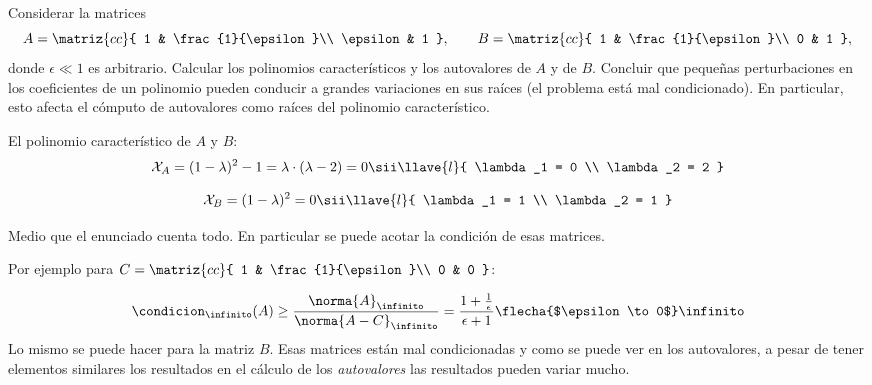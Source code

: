 \begin{enunciado}{\ejercicio}
  Considerar la matrices
  $$
    A =
    \matriz{cc}{
      1 & \frac{1}{\epsilon}\\
      \epsilon & 1
    },
    \qquad
    B =
    \matriz{cc}{
      1 & \frac{1}{\epsilon}\\
      0 & 1
    },
  $$
  donde $\epsilon \ll 1$ es arbitrario. Calcular los polinomios característicos y los autovalores de $A$ y de $B$.
  Concluir que pequeñas perturbaciones en los coeficientes de un polinomio pueden conducir
  a grandes variaciones en sus raíces (el problema está mal condicionado). En particular, esto
  afecta el cómputo de autovalores como raíces del polinomio característico.
\end{enunciado}

El polinomio característico de $A$ y $B$:
$$
  \mathcal{X}_A  =  (1 - \lambda)^2 - 1 = \lambda \cdot (\lambda - 2) = 0
  \sii
  \llave{l}{
    \lambda_1 = 0                                                             \\
    \lambda_2 = 2
  }                                                                         \\
$$

$$
  \mathcal{X}_B  =  (1 - \lambda)^2 = 0
  \sii
  \llave{l}{
    \lambda_1 = 1                                                             \\
    \lambda_2 = 1
  }
$$

Medio que el enunciado cuenta todo. En particular se puede acotar la condición de esas matrices.

Por ejemplo para
$C =
  \matriz{cc}{
    1 & \frac{1}{\epsilon}\\
    0 & 0
  }$:

$$
  \condicion_\infinito(A) \geq \frac{\norma{A}_\infinito}{\norma{A - C}_\infinito} =
  \frac{1 + \frac{1}{\epsilon}}{\epsilon + 1}
  \flecha{$\epsilon \to 0$}
  \infinito
$$
Lo mismo se puede hacer para la matriz $B$. Esas matrices están mal condicionadas y como se puede ver en los autovalores,
a pesar de tener elementos similares los resultados en el cálculo de los \textit{autovalores} las resultados pueden variar mucho.

\begin{aportes}
  \item {}
\end{aportes}
